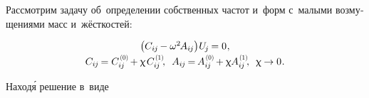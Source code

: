 \begin{otherlanguage}{russian}

Рассмотрим задачу об~определении собственных частот и~форм с~малыми возмущениями масс и~жёсткостей:

\nopagebreak\vspace{-0.1em}\begin{equation}\begin{array}{c}
\bigl( C_{i\hspace{-0.1ex}j} \hspace{-0.15ex} - \omega^2 \hspace{-0.2ex} A_{i\hspace{-0.1ex}j} \bigr) \hspace{.1ex} U_{\hspace{-0.2ex}j} \hspace{-0.15ex} = 0 \hspace{.1ex} ,
\\[.2em]
%
C_{i\hspace{-0.1ex}j} \hspace{-0.2ex} = C_{i\hspace{-0.1ex}j}^{\hspace{.2ex}\scalebox{0.66}[0.66]{(0)}} \hspace{-0.2ex} + \smallparameter \hspace{.2ex} C_{i\hspace{-0.1ex}j}^{\hspace{.2ex}\scalebox{0.66}[0.66]{(1)}} \hspace{-0.4ex} ,
\;\:
A_{i\hspace{-0.1ex}j} \hspace{-0.2ex} = \hspace{-0.2ex} A_{i\hspace{-0.1ex}j}^{\hspace{.2ex}\scalebox{0.66}[0.66]{(0)}} \hspace{-0.2ex} + \smallparameter \hspace{-0.1ex} A_{i\hspace{-0.1ex}j}^{\hspace{.2ex}\scalebox{0.66}[0.66]{(1)}} \hspace{-0.4ex} ,
\;\:
\smallparameter \hspace{-0.12ex} \to 0 \hspace{.1ex} .
\end{array}\end{equation}

\vspace{-0.2em} \noindent Наход\'{я} решение в~виде


\end{otherlanguage}
